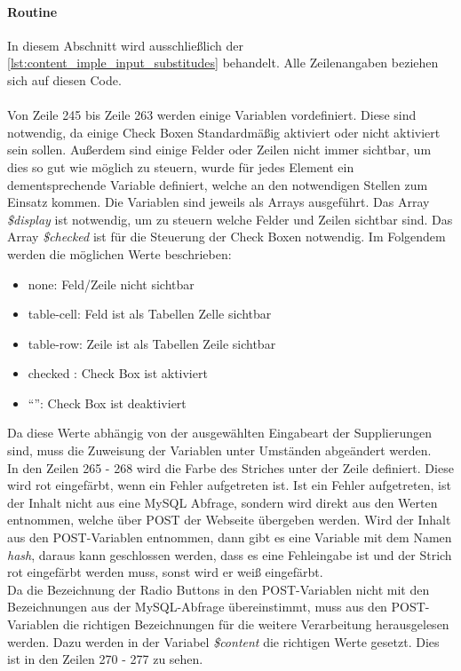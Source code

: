 \paragraph{Routine}
In diesem Abschnitt wird ausschließlich der \autoref{lst:content_imple_input_substitudes} behandelt. Alle Zeilenangaben beziehen sich auf diesen Code.\\
\\
Von Zeile 245 bis Zeile 263 werden einige Variablen vordefiniert. Diese sind notwendig, da einige Check Boxen Standardmäßig aktiviert oder nicht aktiviert sein sollen. Außerdem sind einige Felder oder Zeilen nicht immer sichtbar, um dies so gut wie möglich zu steuern, wurde für jedes Element ein dementsprechende Variable definiert, welche an den notwendigen Stellen zum Einsatz kommen. Die Variablen sind jeweils als Arrays ausgeführt. Das Array \textit{\$display} ist notwendig, um zu steuern welche Felder und Zeilen sichtbar sind. Das Array \textit{\$checked} ist für die Steuerung der Check Boxen notwendig.
Im Folgendem werden die möglichen Werte beschrieben:
\begin{itemize}
	\item none: Feld/Zeile nicht sichtbar
	\item table-cell: Feld ist als Tabellen Zelle sichtbar
	\item table-row: Zeile ist als Tabellen Zeile sichtbar
	\item checked : Check Box ist aktiviert
	\item \enquote{}: Check Box ist deaktiviert
\end{itemize}
Da diese Werte abhängig von der ausgewählten Eingabeart der Supplierungen sind, muss die Zuweisung der Variablen unter Umständen abgeändert werden.\\
In den Zeilen 265 - 268 wird die Farbe des Striches unter der Zeile definiert. Diese wird rot eingefärbt, wenn ein Fehler aufgetreten ist. Ist ein Fehler aufgetreten, ist der Inhalt nicht aus eine MySQL Abfrage, sondern wird direkt aus den Werten entnommen, welche über POST der Webseite übergeben werden. Wird der Inhalt aus den POST-Variablen entnommen, dann gibt es eine Variable mit dem Namen \textit{hash}, daraus kann geschlossen werden, dass es eine Fehleingabe ist und der Strich rot eingefärbt werden muss, sonst wird er weiß eingefärbt.\\
Da die Bezeichnung der Radio Buttons in den POST-Variablen nicht mit den Bezeichnungen aus der MySQL-Abfrage übereinstimmt, muss aus den POST-Variablen die richtigen Bezeichnungen für die weitere Verarbeitung herausgelesen werden. Dazu werden in der Variabel \textit{\$content} die richtigen Werte gesetzt. Dies ist in den Zeilen 270 - 277 zu sehen.\\
